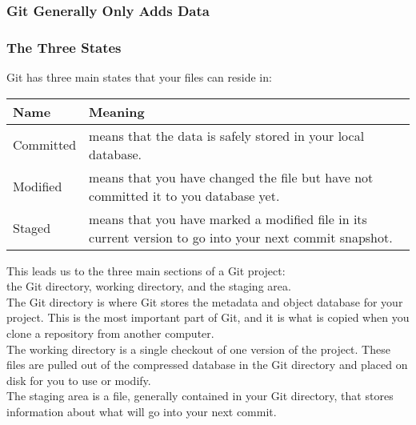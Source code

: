 \documentclass[11pt]{article}
\begin{document}
\subsubsection{Git Generally Only Adds Data}
\label{sec:org3cf22ec}

\subsubsection{The Three States}
\label{sec:org7e4403b}
Git has three main states that your files can reside in:\\

\begin{center}
\begin{tabular}{ll}
Name & Meaning\\
\hline
Committed & means that the data is safely stored in your local database.\\
Modified & means that you have changed the file but have not committed it to you database yet.\\
Staged & means that you have marked a modified file in its current version to go into your next commit snapshot.\\
\end{tabular}
\end{center}

This leads us to the three main sections of a Git project:\\
the Git directory, working directory, and the staging area.\\
The Git directory is where Git stores the metadata and object database for your project. This is the most important part of Git, and it is what is copied when you clone a repository from another computer.\\
The working directory is a single checkout of one version of the project. These files are pulled out of the compressed database in the Git directory and placed on disk for you to use or modify.\\
The staging area is a file, generally contained in your Git directory, that stores information about what will go into your next commit.\\
\end{document}
